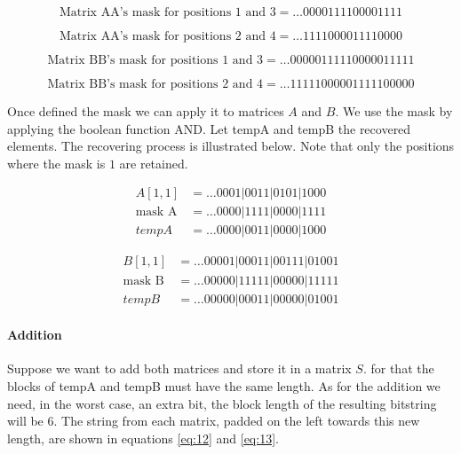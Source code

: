 \documentclass[12pt]{article}
\begin{document}
\begin{equation}\label{eq:06}
\text{Matrix AA's mask for positions 1 and 3} = \ldots0000111100001111
\end{equation}

\begin{equation}\label{eq:07}
\text{Matrix AA's mask for positions 2 and 4} = \ldots1111000011110000
\end{equation}

\begin{equation}\label{eq:08}
\text{Matrix BB's mask for positions 1 and 3} = \ldots00000111110000011111
\end{equation}

\begin{equation}\label{eq:09}
\text{Matrix BB's mask for positions 2 and 4} = \ldots11111000001111100000
\end{equation}

Once defined the mask we can apply it to matrices $A$ and $B$. We use the mask
by applying the boolean function AND. Let tempA and tempB the recovered
elements. The recovering process is illustrated below. Note that only the
positions where the mask is $1$ are retained.

  \begin{align*}
   A[1,1]			&=	\ldots0001|0011|0101|1000\\
   \text{mask A}	&=	\ldots0000|1111|0000|1111\\
   tempA 			&=	\ldots0000|0011|0000|1000
  \end{align*}

  \begin{align*}
   B[1,1]			&= \ldots00001|00011|00111|01001 \\
   \text{mask B}	&= \ldots00000|11111|00000|11111 \\
   tempB 			&= \ldots00000|00011|00000|01001
  \end{align*}

\paragraph{Addition}

Suppose we want to add both matrices and store it in a matrix $S$. for that the
blocks of tempA and tempB must have the same length. As for the addition we
need, in the worst case, an extra bit, the block length of the resulting
bitstring will be 6. The string from each matrix, padded on the left towards
this new length,  are shown in equations \ref{eq:12} and \ref{eq:13}.
\end{document}
